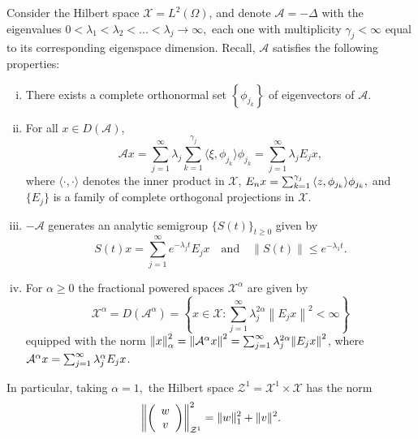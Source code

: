 \documentclass[11 pt]{amsart}
\begin{document}
Consider the Hilbert space ${\mathcal{X}} = L^{2}(\Omega)$,  and denote  ${\mathcal{A}}=-\Delta$ with the eigenvalues  $0 <
\lambda_{1}<\lambda_{2}<...<\lambda_{j}\to \infty,$ each one with multiplicity $\gamma_{j}<\infty$ equal to its corresponding eigenspace dimension. Recall, ${\mathcal{A}}$ satisfies the following properties:
\begin{enumerate}[(i)]
\item There exists a complete orthonormal set $\left\{
\phi_{j_k} \right\}$ of eigenvectors of ${\mathcal{A}}$.\\

\item For all $x \in D({\mathcal{A}})$,
\begin{equation*} \label{prop}
{\mathcal{A}} x = \sum_{j = 1}^{\infty} \lambda_{j} \sum_{k =
1}^{\gamma_j} {\langle {\xi, \phi_{j_k}}\rangle} \phi_{j_k} =\sum_{j = 1}^{\infty}
\lambda_{j}E_{j}x,
\end{equation*}
where ${\langle {\cdot, \cdot}\rangle}$ denotes the inner product in ${\mathcal{X}}$, ${\displaystyle} E_{n}x = \sum_{k = 1}^{\gamma_j} {\langle {z, \phi_{j_k}}\rangle} \phi_{j_k},$ and  $\{ E_j \}$ is a family of complete orthogonal projections in
${\mathcal{X}}$.
 \item $-{\mathcal{A}}$ generates an analytic semigroup $\{
S(t) \}_{t \geq 0}$ given by
$$
S(t)x =  \sum_{j = 1}^{\infty} e^{-\lambda_j t}E_{j}x \quad  \mbox{and} \quad  {\left\| {S(t)}\right\|} \leq e^{-\lambda_{1}t}.
$$

\item For $\alpha\geq0$ the fractional powered spaces ${\mathcal{X}}^{\alpha}$ are given by
\begin{equation*}
   {\mathcal{X}}^{\alpha} =D({\mathcal{A}}^{\alpha}) = \left\{x \in {\mathcal{X}} : \sum_{j = 1}^{\infty} \lambda_{j} ^{2
\alpha} {\left\| { E_{j}x}\right\|}^2 < \infty \right\}
\end{equation*}
equipped with the norm ${\displaystyle}
{\left\| {x}\right\|}_{\alpha}^2 = {\left\| {{\mathcal{A}}^{\alpha}x}\right\|}^2=  \sum_{j = 1}^{\infty}
\lambda_{j}^{2 \alpha} {\left\| { E_{j}x}\right\|}^2
$, where ${\displaystyle} {\mathcal{A}}^{\alpha}x = \sum_{j = 1}^{\infty} \lambda_{j}^{ \alpha}  E_{j}x$.

\end{enumerate}

In particular, taking $\alpha=1,$ the Hilbert space ${\mathcal{Z}}^{1}={\mathcal{X}}^{1}\times {\mathcal{X}}$ has the  norm
$$
{\displaystyle} {\left\| {\left(
                  \begin{array}{c}
                    w \\
                    v \\
                  \end{array}
                \right)}\right\|}^{2}_{{\mathcal{Z}}^{1}}=\|w\|^{2}_{1}+\|v\|^{2}.
$$
\end{document}
